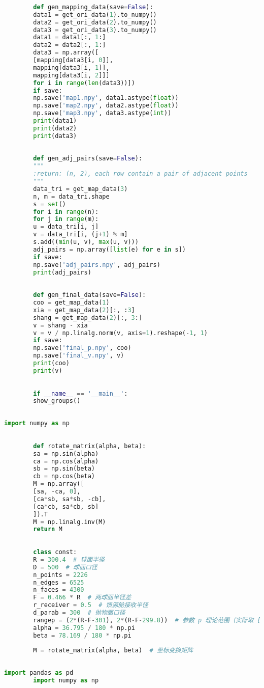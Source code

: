\documentclass[withoutpreface,bwprint,fontset=macnew]{cumcmthesis} %
\begin{document}
\begin{appendices}
\begin{lstlisting}[language=python]
		
		def gen_mapping_data(save=False):
		data1 = get_ori_data(1).to_numpy()
		data2 = get_ori_data(2).to_numpy()
		data3 = get_ori_data(3).to_numpy()
		data1 = data1[:, 1:]
		data2 = data2[:, 1:]
		data3 = np.array([
		[mapping[data3[i, 0]],
		mapping[data3[i, 1]],
		mapping[data3[i, 2]]]
		for i in range(len(data3))])
		if save:
		np.save('map1.npy', data1.astype(float))
		np.save('map2.npy', data2.astype(float))
		np.save('map3.npy', data3.astype(int))
		print(data1)
		print(data2)
		print(data3)
		
		
		def gen_adj_pairs(save=False):
		"""
		:return: (n, 2), each row contain a pair of adjacent points
		"""
		data_tri = get_map_data(3)
		n, m = data_tri.shape
		s = set()
		for i in range(n):
		for j in range(m):
		u = data_tri[i, j]
		v = data_tri[i, (j+1) % m]
		s.add((min(u, v), max(u, v)))
		adj_pairs = np.array([list(e) for e in s])
		if save:
		np.save('adj_pairs.npy', adj_pairs)
		print(adj_pairs)
		
		
		def gen_final_data(save=False):
		coo = get_map_data(1)
		xia = get_map_data(2)[:, :3]
		shang = get_map_data(2)[:, 3:]
		v = shang - xia
		v = v / np.linalg.norm(v, axis=1).reshape(-1, 1)
		if save:
		np.save('final_p.npy', coo)
		np.save('final_v.npy', v)
		print(coo)
		print(v)
		
		
		if __name__ == '__main__':
		show_groups()
		
	\end{lstlisting}
	
	\begin{lstlisting}[language=python]
		import numpy as np
		
		
		def rotate_matrix(alpha, beta):
		sa = np.sin(alpha)
		ca = np.cos(alpha)
		sb = np.sin(beta)
		cb = np.cos(beta)
		M = np.array([
		[sa, -ca, 0],
		[ca*sb, sa*sb, -cb],
		[ca*cb, sa*cb, sb]
		]).T
		M = np.linalg.inv(M)
		return M
		
		
		class const:
		R = 300.4  # 球面半径
		D = 500  # 球面口径
		n_points = 2226
		n_edges = 6525
		n_faces = 4300
		F = 0.466 * R  # 两球面半径差
		r_receiver = 0.5  # 馈源舱接收半径
		d_parab = 300  # 抛物面口径
		rangep = (2*(R-F-301), 2*(R-F-299.8))  # 参数 p 理论范围（实际取 [-285, -275]）
		alpha = 36.795 / 180 * np.pi
		beta = 78.169 / 180 * np.pi
		
		M = rotate_matrix(alpha, beta)  # 坐标变换矩阵
		
	\end{lstlisting}
	
	\begin{lstlisting}[language=python]
		import pandas as pd
		import numpy as np
		

\end{lstlisting}
\end{appendices}
\end{document}
